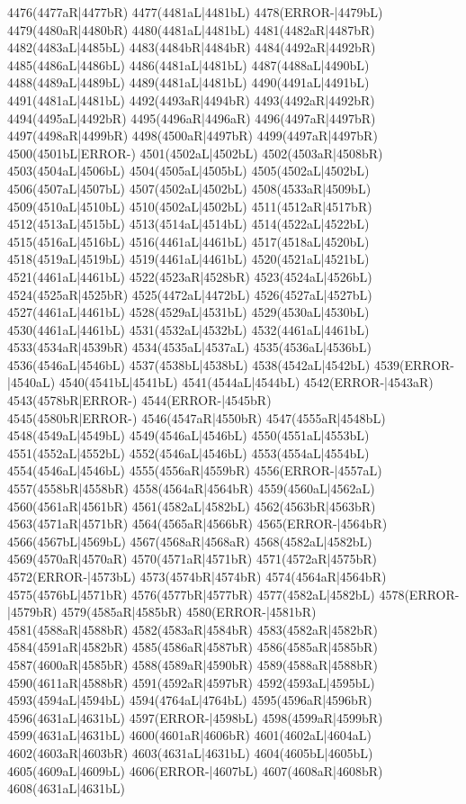 4476(4477aR|4477bR) 4477(4481aL|4481bL) 4478(ERROR-|4479bL) 4479(4480aR|4480bR) 4480(4481aL|4481bL) 4481(4482aR|4487bR) \\4482(4483aL|4485bL) 4483(4484bR|4484bR) 4484(4492aR|4492bR) 4485(4486aL|4486bL) 4486(4481aL|4481bL) 4487(4488aL|4490bL) 4488(4489aL|4489bL) 4489(4481aL|4481bL) 4490(4491aL|4491bL) \\4491(4481aL|4481bL) 4492(4493aR|4494bR) 4493(4492aR|4492bR) 4494(4495aL|4492bR) 4495(4496aR|4496aR) 4496(4497aR|4497bR) 4497(4498aR|4499bR) 4498(4500aR|4497bR) 4499(4497aR|4497bR) \\4500(4501bL|ERROR-) 4501(4502aL|4502bL) 4502(4503aR|4508bR) 4503(4504aL|4506bL) 4504(4505aL|4505bL) 4505(4502aL|4502bL) 4506(4507aL|4507bL) 4507(4502aL|4502bL) 4508(4533aR|4509bL) \\4509(4510aL|4510bL) 4510(4502aL|4502bL) 4511(4512aR|4517bR) 4512(4513aL|4515bL) 4513(4514aL|4514bL) 4514(4522aL|4522bL) 4515(4516aL|4516bL) 4516(4461aL|4461bL) 4517(4518aL|4520bL) \\4518(4519aL|4519bL) 4519(4461aL|4461bL) 4520(4521aL|4521bL) 4521(4461aL|4461bL) 4522(4523aR|4528bR) 4523(4524aL|4526bL) 4524(4525aR|4525bR) 4525(4472aL|4472bL) 4526(4527aL|4527bL) \\4527(4461aL|4461bL) 4528(4529aL|4531bL) 4529(4530aL|4530bL) 4530(4461aL|4461bL) 4531(4532aL|4532bL) 4532(4461aL|4461bL) 4533(4534aR|4539bR) 4534(4535aL|4537aL) 4535(4536aL|4536bL) \\4536(4546aL|4546bL) 4537(4538bL|4538bL) 4538(4542aL|4542bL) 4539(ERROR-|4540aL) 4540(4541bL|4541bL) 4541(4544aL|4544bL) 4542(ERROR-|4543aR) 4543(4578bR|ERROR-) 4544(ERROR-|4545bR) \\4545(4580bR|ERROR-) 4546(4547aR|4550bR) 4547(4555aR|4548bL) 4548(4549aL|4549bL) 4549(4546aL|4546bL) 4550(4551aL|4553bL) 4551(4552aL|4552bL) 4552(4546aL|4546bL) 4553(4554aL|4554bL) \\4554(4546aL|4546bL) 4555(4556aR|4559bR) 4556(ERROR-|4557aL) 4557(4558bR|4558bR) 4558(4564aR|4564bR) 4559(4560aL|4562aL) 4560(4561aR|4561bR) 4561(4582aL|4582bL) 4562(4563bR|4563bR) \\4563(4571aR|4571bR) 4564(4565aR|4566bR) 4565(ERROR-|4564bR) 4566(4567bL|4569bL) 4567(4568aR|4568aR) 4568(4582aL|4582bL) 4569(4570aR|4570aR) 4570(4571aR|4571bR) 4571(4572aR|4575bR) \\4572(ERROR-|4573bL) 4573(4574bR|4574bR) 4574(4564aR|4564bR) 4575(4576bL|4571bR) 4576(4577bR|4577bR) 4577(4582aL|4582bL) 4578(ERROR-|4579bR) 4579(4585aR|4585bR) 4580(ERROR-|4581bR) \\4581(4588aR|4588bR) 4582(4583aR|4584bR) 4583(4582aR|4582bR) 4584(4591aR|4582bR) 4585(4586aR|4587bR) 4586(4585aR|4585bR) 4587(4600aR|4585bR) 4588(4589aR|4590bR) 4589(4588aR|4588bR) \\4590(4611aR|4588bR) 4591(4592aR|4597bR) 4592(4593aL|4595bL) 4593(4594aL|4594bL) 4594(4764aL|4764bL) 4595(4596aR|4596bR) 4596(4631aL|4631bL) 4597(ERROR-|4598bL) 4598(4599aR|4599bR) \\4599(4631aL|4631bL) 4600(4601aR|4606bR) 4601(4602aL|4604aL) 4602(4603aR|4603bR) 4603(4631aL|4631bL) 4604(4605bL|4605bL) 4605(4609aL|4609bL) 4606(ERROR-|4607bL) 4607(4608aR|4608bR) \\4608(4631aL|4631bL) 